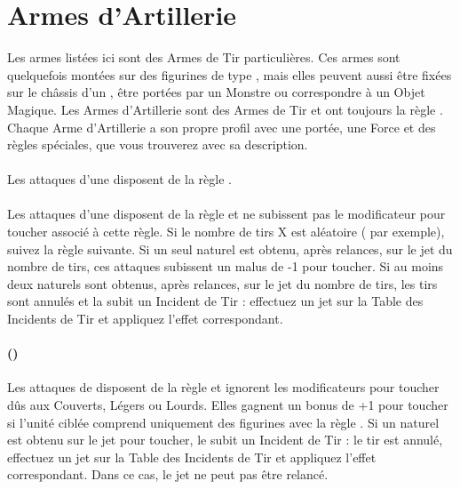 \newpage
\hypertarget{artilleryweapons}{\section{Armes d'Artillerie}}
\label{artillery_weapons}

Les armes listées ici sont des Armes de Tir particulières. Ces armes sont quelquefois montées sur des figurines de type \warmachine{}, mais elles peuvent aussi être fixées sur le châssis d'un \chariot{}, être portées par un Monstre ou correspondre à un Objet Magique. Les Armes d'Artillerie sont des Armes de Tir et ont toujours la règle \og \reload{} \fg{}. Chaque Arme d'Artillerie a son propre profil avec une portée, une Force et des règles spéciales, que vous trouverez avec sa description.

\paragraph{\boltthrower}

Les attaques d'une \boltthrower{} disposent de la règle \penetrating{}.

\paragraph{}

Les attaques d'une \volleygun{} disposent de la règle  et ne subissent pas le modificateur pour toucher associé à cette règle. Si le nombre de tirs X est aléatoire ( par exemple), suivez la règle suivante. Si un seul  naturel est obtenu, après relances, sur le jet du nombre de tirs, ces attaques subissent un malus de -1 pour toucher. Si au moins deux  naturels sont obtenus, après relances, sur le jet du nombre de tirs, les tirs sont annulés et la \volleygun{} subit un Incident de Tir : effectuez un jet sur la Table des Incidents de Tir et appliquez l'effet correspondant.

\paragraph{\cannon{} ()}

Les attaques de \cannon{} disposent de la règle \penetrating{} et ignorent les modificateurs pour toucher dûs aux Couverts, Légers ou Lourds. Elles gagnent un bonus de +1 pour toucher si l'unité ciblée comprend uniquement des figurines avec la règle \toweringpresence{}. Si un  naturel est obtenu sur le jet pour toucher, le \cannon{} subit un Incident de Tir : le tir est annulé, effectuez un jet sur la Table des Incidents de Tir et appliquez l'effet correspondant. Dans ce cas, le jet ne peut pas être relancé.

